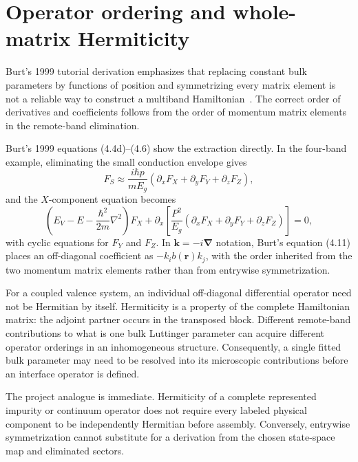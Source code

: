 \section{Operator ordering and whole-matrix Hermiticity}

Burt's 1999 tutorial derivation emphasizes that replacing constant bulk
parameters by functions of position and symmetrizing every matrix element is not
a reliable way to construct a multiband Hamiltonian~\cite{burt1999}. The correct
order of derivatives and coefficients follows from the order of momentum matrix
elements in the remote-band elimination.

Burt's 1999 equations (4.4d)--(4.6) show the extraction directly. In the
four-band example, eliminating the small conduction envelope gives
\begin{equation}
  F_S
  \approx
  \frac{i\hbar p}{mE_g}
  \left(
    \partial_xF_X+\partial_yF_Y+\partial_zF_Z
  \right),
  \label{eq:burt-eliminated-conduction-envelope}
\end{equation}
and the $X$-component equation becomes
\begin{equation}
  \left(E_V-E-\frac{\hbar^2}{2m}\nabla^2\right)F_X
  +
  \partial_x\!\left[
    \frac{P^2}{E_g}
    \left(
      \partial_xF_X+\partial_yF_Y+\partial_zF_Z
    \right)
  \right]
  =0,
  \label{eq:burt-valence-component}
\end{equation}
with cyclic equations for $F_Y$ and $F_Z$. In $\mathbf k=-i\boldsymbol\nabla$
notation, Burt's equation (4.11) places an off-diagonal coefficient as
$-k_i b(\mathbf r)k_j$, with the order inherited from the two momentum matrix
elements rather than from entrywise symmetrization.

For a coupled valence system, an individual off-diagonal differential operator
need not be Hermitian by itself. Hermiticity is a property of the complete
Hamiltonian matrix: the adjoint partner occurs in the transposed block. Different
remote-band contributions to what is one bulk Luttinger parameter can acquire
different operator orderings in an inhomogeneous structure. Consequently, a
single fitted bulk parameter may need to be resolved into its microscopic
contributions before an interface operator is defined.

The project analogue is immediate. Hermiticity of a complete represented
impurity or continuum operator does not require every labeled physical component
to be independently Hermitian before assembly. Conversely, entrywise
symmetrization cannot substitute for a derivation from the chosen state-space
map and eliminated sectors.


